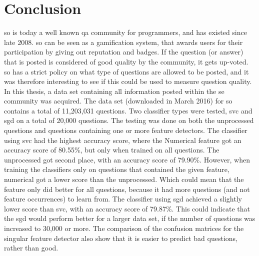 \label{chap:chapter6}

\section{Conclusion}
\label{sec:conclusion}
\gls{so} is today a well known \gls{qa} community for programmers, and has existed since late 2008.
\gls{so} can be seen as a gamification system, that awards users for their participation by giving out reputation and badges. 
If the question (or answer) that is posted is considered of good quality by the community, it gets up-voted. 
\gls{so} has a strict policy on what type of questions are allowed to be posted, and it was therefore interesting to see if this could be used to measure question quality. 
\vspace{0.5em}\newline
In this thesis, a data set containing all information posted within the \gls{se} community was acquired.
The data set (downloaded in March 2016) for \gls{so} contains a total of 11,203,031 questions.
Two classifier types were tested, \gls{svc} and \gls{sgd} on a total of 20,000 questions.
The testing was done on both the unprocessed questions and questions containing one or more feature detectors.
The classifier using \gls{svc} had the highest accuracy score, where the Numerical feature got an accuracy score of 80.55\%, but only when trained on all questions. 
The unprocessed got second place, with an accuracy score of 79.90\%.
However, when training the classifiers only on questions that contained the given feature, numerical got a lower score than the unprocessed.
Which could mean that the feature only did better  for all questions, because it had more questions (and not feature occurrences) to learn from. 
\vspace{0.5em}\newline
The classifier using \gls{sgd} achieved a slightly lower score than \gls{svc}, with an accuracy score of 79.87\%.
This could indicate that the \gls{sgd} would perform better for a larger data set, if the number of questions was increased to 30,000 or more.
The comparison of the confusion matrices for the singular feature detector also show that it is easier to predict bad questions, rather than good.


